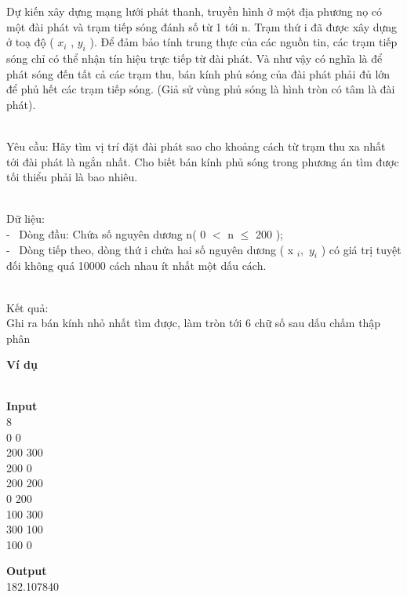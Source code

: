

Dự kiến xây dựng mạng lưới phát thanh, truyền hình ở một địa phương nọ có một đài phát và trạm tiếp sóng đánh số từ 1 tới n. Trạm thứ i đã được xây dựng ở toạ độ ( $x_{i}$ , $y_{i}$ ). Để đảm bảo tính trung thực của các nguồn tin, các trạm tiếp sóng chỉ có thể nhận tín hiệu trực tiếp từ đài phát. Và như vậy có nghĩa là để phát sóng đến tất cả các trạm thu, bán kính phủ sóng của đài phát phải đủ lớn để phủ hết các trạm tiếp sóng. (Giả sử vùng phủ sóng là hình tròn có tâm là đài phát).


\\Yêu cầu: Hãy tìm vị trí đặt đài phát sao cho khoảng cách từ trạm thu xa nhất tới đài phát là ngắn nhất. Cho biết bán kính phủ sóng trong phương án tìm được tối thiểu phải là bao nhiêu.


\\Dữ liệu:
\\-  Dòng đầu: Chứa số nguyên dương n( 0 $<$ n  $\le$  200 );
\\-  Dòng tiếp theo, dòng thứ i chứa hai số nguyên dương ( x $_ i , $ $y_{i}$ ) có giá trị tuyệt đối không quá 10000 cách nhau ít nhất một dấu cách.


\\Kết quả:
\\Ghi ra bán kính nhỏ nhất tìm được, làm tròn tới 6 chữ số sau dấu chấm thập phân

\textbf{Ví dụ }


\\\textbf{Input}
\\8
\\0 0
\\200 300
\\200 0
\\200 200
\\0 200
\\100 300
\\300 100
\\100 0\textbf{}

\textbf{Output}
\\182.107840
